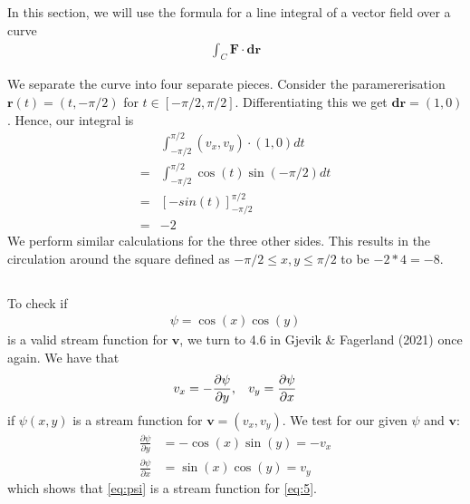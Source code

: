 \documentclass[a4paper,10pt,english]{article}
\begin{document}
\subsection{}
In this section, we will use the formula for a line integral of a vector field over a curve 
\begin{align}
    \int_C \bm{F} \cdot \bm{dr}
\end{align}

We separate the curve into four separate pieces. Consider the paramererisation $\bm{r}(t) = (t, -\pi/2)$ for $t\in[-\pi/2, \pi/2]$. Differentiating this we get $\bm{dr} = (1, 0)$. Hence, our integral is
\begin{align*}
    & \int_{-\pi/2}^{\pi/2} (v_x, v_y) \cdot (1, 0) dt \\
    = &\int_{-\pi/2}^{\pi/2} \cos(t)\sin(-\pi/2) dt \\
    = &\left[ -sin(t)\right]_{-\pi/2}^{\pi/2} \\
    = &-2
\end{align*}
We perform similar calculations for the three other sides. This results in the circulation around the square defined as $-\pi/2 \leq x, y \leq \pi/2$ to be $-2*4 = -8$.

\subsection{}
To check if 
\begin{align}
    \psi = \cos(x)\cos(y)
    \label{eq:psi}
\end{align}
is a valid stream function for $\bm{v}$, we turn to 4.6 in Gjevik \& Fagerland (2021) once again. We have that 
\begin{align}
    v_x = -\frac{\partial \psi}{\partial y}, 
    \hspace{.3cm} v_y = \frac{\partial \psi}{\partial x}
\end{align}
if $\psi(x, y)$ is a stream function for $\bm{v} = (v_x, v_y)$. We test for our given $\psi$ and $\bm{v}$:
\begin{align*}
    \frac{\partial \psi}{\partial y} &= -\cos(x)\sin(y) = - v_x \\
    \frac{\partial \psi}{\partial x} &= \sin(x)\cos(y) = v_y
\end{align*}
which shows that \eqref{eq:psi} is a stream function for \eqref{eq:5}.
\end{document}
